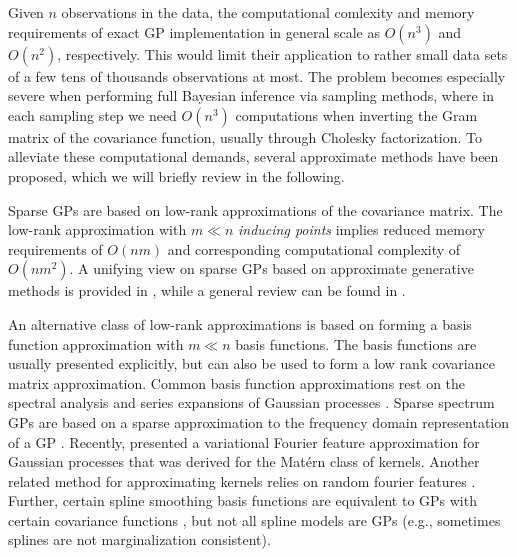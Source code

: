 \documentclass[]{interact}
\theoremstyle{plain}%
\theoremstyle{definition}
\theoremstyle{remark}
\begin{document}
Given $n$ observations in the data, the computational comlexity and memory requirements of exact GP implementation in general scale as $O(n^3)$ and $O(n^2)$, respectively. This would limit their application to rather small data sets of a few tens of thousands observations at most. The problem becomes especially severe when performing full Bayesian inference via sampling methods, where in each sampling step we need $O(n^3)$ computations when inverting the Gram matrix of the covariance function, usually through Cholesky factorization. To alleviate these computational demands, several approximate methods have been proposed, which we will briefly review in the following. 

Sparse GPs are based on low-rank approximations of the covariance matrix. The low-rank approximation with $m \ll n$ {\it inducing points} implies reduced memory requirements of $O(nm)$ and corresponding computational complexity of $O(nm^2)$.
A unifying view on sparse GPs based on approximate generative methods
is provided in \cite{quinonero2005unifying}, while a general review
can be found in \cite{rasmussen2006gaussian}.

An alternative class of low-rank approximations is based on forming a basis function approximation with $m \ll n$ basis functions. The basis functions are usually presented explicitly, but can also be used to form a low rank covariance matrix approximation. Common basis function approximations rest on the spectral analysis and series expansions of Gaussian processes \citep{loeve1977probability,trees1968detection,adler1981geometry,cramer2013stationary}.
Sparse spectrum GPs are based on a sparse approximation to the frequency domain representation of a GP \citep{lazaro2010sparse,quia2010sparse,gal2015improving}. Recently, \cite{hensman2017variational} presented a variational Fourier feature approximation for Gaussian processes that was derived for the Mat{\'e}rn class of kernels. Another related method for approximating kernels relies on random fourier features \citep{rahimi2008random,rahimi2009weighted}.
Further, certain spline smoothing basis functions are equivalent to GPs with certain covariance functions \citep{wahba1990spline}, but not all spline models are GPs (e.g., sometimes splines are not marginalization consistent).
\end{document}
